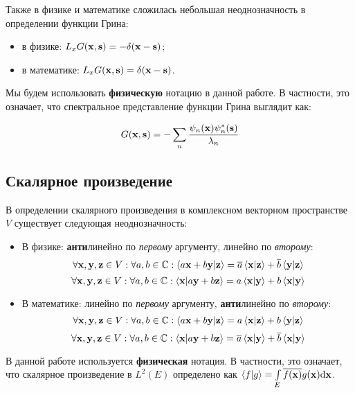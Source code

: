 Также в физике и математике сложилась небольшая неоднозначность в определении функции Грина:

\begin{itemize}
\item в физике: $L_x G(\vb{x}, \vb{s}) = -\delta(\vb{x} - \vb{s})$;
\item в математике: $L_x G(\vb{x}, \vb{s}) = \delta(\vb{x} - \vb{s})$.
\end{itemize} 

Мы будем использовать \textbf{физическую} нотацию в данной работе. В частности, это означает, что спектральное представление функции Грина выглядит как: 

\[
G(\vb{x}, \vb{s}) = -\sum\limits_n \frac{\psi_n(\vb{x}) \psi_n^*(\vb{s})}{\lambda_n}
\]

\subsection{Скалярное произведение}
В определении скалярного произведения в комплексном векторном пространстве $V$ существует следующая неоднозначность:

\begin{itemize}
\item В физике: \textbf{анти}линейно по \textit{первому} аргументу, линейно по \textit{второму}:
\[
\forall \vb{x}, \vb{y}, \vb{z} \in V: \forall a, b \in \bbC: \ip{a\vb{x} + b\vb{y}}{\vb{z}} = \cconj{a} \ip{\vb{x}}{\vb{z}} + \cconj{b} \ip{\vb{y}}{\vb{z}}
\]
\[
\forall \vb{x}, \vb{y}, \vb{z} \in V: \forall a, b \in \bbC: \ip{\vb{x}}{a\vb{y} + b\vb{z}} = a \ip{\vb{x}}{\vb{y}} + b \ip{\vb{x}}{\vb{y}}
\]
\item В математике: линейно по \textit{первому} аргументу, \textbf{анти}линейно по \textit{второму}:
\[
\forall \vb{x}, \vb{y}, \vb{z} \in V: \forall a, b \in \bbC: \ip{a\vb{x} + b\vb{y}}{\vb{z}} = a \ip{\vb{x}}{\vb{z}} + b \ip{\vb{y}}{\vb{z}}
\]
\[
\forall \vb{x}, \vb{y}, \vb{z} \in V: \forall a, b \in \bbC: \ip{\vb{x}}{a\vb{y} + b\vb{z}} = \cconj{a} \ip{\vb{x}}{\vb{y}} + \cconj{b} \ip{\vb{x}}{\vb{y}}
\]
\end{itemize}

В данной работе используется \textbf{физическая} нотация. В частности, это означает, что скалярное произведение в $L^2(E)$ определено как $\ip{f}{g} = \int\limits_E \cconj{f(\vb{x})} g(\vb{x}) \dd \vb{x}$.


